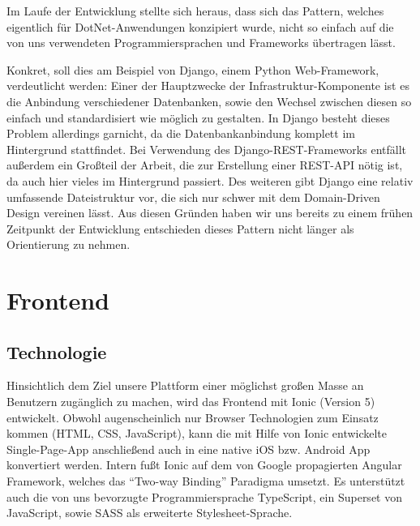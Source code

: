 \documentclass{article}
\begin{document}

Im Laufe der Entwicklung stellte sich heraus, dass sich das Pattern, welches eigentlich für DotNet-Anwendungen konzipiert wurde, nicht so einfach auf die von uns verwendeten Programmiersprachen und Frameworks übertragen lässt.

Konkret, soll dies am Beispiel von Django, einem Python Web-Framework, verdeutlicht werden: Einer der Hauptzwecke der Infrastruktur-Komponente ist es die Anbindung verschiedener Datenbanken, sowie den Wechsel zwischen diesen so einfach und standardisiert wie möglich zu gestalten. In Django besteht dieses Problem allerdings garnicht, da die Datenbankanbindung komplett im Hintergrund stattfindet. Bei Verwendung des Django-REST-Frameworks entfällt außerdem ein Großteil der Arbeit, die zur Erstellung einer REST-API nötig ist, da auch hier vieles im Hintergrund passiert. Des weiteren gibt Django eine relativ umfassende Dateistruktur vor, die sich nur schwer mit dem Domain-Driven Design vereinen lässt. Aus diesen Gründen haben wir uns bereits zu einem frühen Zeitpunkt der Entwicklung entschieden dieses Pattern nicht länger als Orientierung zu nehmen.


\section{Frontend} %


\subsection{Technologie}
\label{sec:frontend-tech}

Hinsichtlich dem Ziel unsere Plattform einer möglichst großen Masse an Benutzern zugänglich zu machen, wird das Frontend mit Ionic (Version 5) entwickelt. Obwohl augenscheinlich nur Browser Technologien zum Einsatz kommen (HTML, CSS, JavaScript), kann die mit Hilfe von Ionic entwickelte Single-Page-App anschließend auch in eine native iOS bzw. Android App konvertiert werden. Intern fußt Ionic auf dem von Google propagierten Angular Framework, welches das \enquote{Two-way Binding} Paradigma umsetzt. Es unterstützt auch die von uns bevorzugte Programmiersprache TypeScript, ein Superset von JavaScript, sowie SASS als erweiterte Stylesheet-Sprache.
\end{document}
